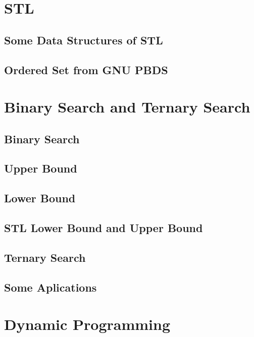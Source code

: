 \section{STL}
\subsection{Some Data Structures of STL}
\raggedbottom
\hrulefill
\subsection{Ordered Set from GNU PBDS}
\raggedbottom
\hrulefill

\section{Binary Search and Ternary Search}
\subsection{Binary Search}
\raggedbottom
\hrulefill
\subsection{Upper Bound}
\raggedbottom
\hrulefill
\subsection{Lower Bound}
\raggedbottom
\hrulefill
\subsection{STL Lower Bound and Upper Bound}
\raggedbottom
\hrulefill
\subsection{Ternary Search}
\raggedbottom
\hrulefill
\subsection{Some Aplications}
\raggedbottom
\hrulefill

\section{Dynamic Programming}
